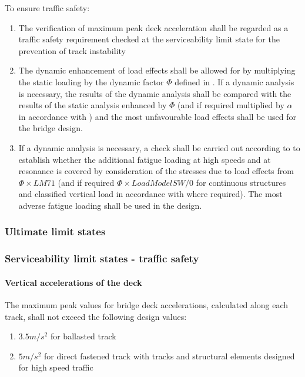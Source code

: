 To ensure traffic safety:
\begin{enumerate}
	\item The verification of maximum peak deck acceleration shall be regarded as a traffic safety requirement checked at the serviceability limit state for the prevention of track instability
	\item The dynamic enhancement of load effects shall be allowed for by multiplying the static loading by the dynamic factor $\varPhi$ defined in \cite[6.4.5]{EC12}. If a dynamic analysis is necessary, the results of the dynamic analysis shall be compared with the results of the static analysis enhanced by $\varPhi$ (and if required multiplied by $\alpha$ in accordance with \cite[6.3.2]{EC12}) and the most unfavourable load effects shall be used for the bridge design.
	\item If a dynamic analysis is necessary, a check shall be carried out according to \cite[6.4.6.6]{EC12} to establish whether the additional fatigue loading at high speeds and at resonance is covered by consideration of the stresses due to load effects from $\varPhi \times LM71$ (and if required $\varPhi \times Load Model SW/0$ for continuous structures and classified vertical load in accordance with \cite[6.3.2(3)]{EC12} where required). The most adverse fatigue loading shall be used in the design.  
\end{enumerate}

\subsubsection{Ultimate limit states}

\subsubsection{Serviceability limit states - traffic safety}

\paragraph{Vertical accelerations of the deck}
The maximum peak values for bridge deck accelerations, calculated along each track, shall not exceed the following design values:

\begin{enumerate}
	\item $ 3.5m/s^2 $ for ballasted track
	\item $ 5m/s^2 $ for direct fastened track with tracks and structural elements designed for high speed traffic
\end{enumerate}

